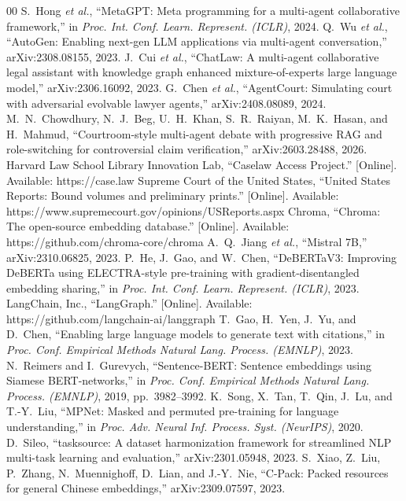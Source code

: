 \documentclass[conference]{IEEEtran}
\begin{document}
\begin{thebibliography}{00}
 S.~Hong \emph{et al.}, ``MetaGPT: Meta programming for a multi-agent collaborative framework,'' in \emph{Proc. Int. Conf. Learn. Represent. (ICLR)}, 2024.
 Q.~Wu \emph{et al.}, ``AutoGen: Enabling next-gen LLM applications via multi-agent conversation,'' arXiv:2308.08155, 2023.
 J.~Cui \emph{et al.}, ``ChatLaw: A multi-agent collaborative legal assistant with knowledge graph enhanced mixture-of-experts large language model,'' arXiv:2306.16092, 2023.
 G.~Chen \emph{et al.}, ``AgentCourt: Simulating court with adversarial evolvable lawyer agents,'' arXiv:2408.08089, 2024.
 M.~N.~Chowdhury, N.~J.~Beg, U.~H.~Khan, S.~R.~Raiyan, M.~K.~Hasan, and H.~Mahmud, ``Courtroom-style multi-agent debate with progressive RAG and role-switching for controversial claim verification,'' arXiv:2603.28488, 2026.
 Harvard Law School Library Innovation Lab, ``Caselaw Access Project.'' [Online]. Available: https://case.law
 Supreme Court of the United States, ``United States Reports: Bound volumes and preliminary prints.'' [Online]. Available: https://www.supremecourt.gov/opinions/USReports.aspx
 Chroma, ``Chroma: The open-source embedding database.'' [Online]. Available: https://github.com/chroma-core/chroma
 A.~Q.~Jiang \emph{et al.}, ``Mistral 7B,'' arXiv:2310.06825, 2023.
 P.~He, J.~Gao, and W.~Chen, ``DeBERTaV3: Improving DeBERTa using ELECTRA-style pre-training with gradient-disentangled embedding sharing,'' in \emph{Proc. Int. Conf. Learn. Represent. (ICLR)}, 2023.
 LangChain, Inc., ``LangGraph.'' [Online]. Available: https://github.com/langchain-ai/langgraph
 T.~Gao, H.~Yen, J.~Yu, and D.~Chen, ``Enabling large language models to generate text with citations,'' in \emph{Proc. Conf. Empirical Methods Natural Lang. Process. (EMNLP)}, 2023.
 N.~Reimers and I.~Gurevych, ``Sentence-BERT: Sentence embeddings using Siamese BERT-networks,'' in \emph{Proc. Conf. Empirical Methods Natural Lang. Process. (EMNLP)}, 2019, pp.~3982--3992.
 K.~Song, X.~Tan, T.~Qin, J.~Lu, and T.-Y.~Liu, ``MPNet: Masked and permuted pre-training for language understanding,'' in \emph{Proc. Adv. Neural Inf. Process. Syst. (NeurIPS)}, 2020.
 D.~Sileo, ``tasksource: A dataset harmonization framework for streamlined NLP multi-task learning and evaluation,'' arXiv:2301.05948, 2023.
 S.~Xiao, Z.~Liu, P.~Zhang, N.~Muennighoff, D.~Lian, and J.-Y.~Nie, ``C-Pack: Packed resources for general Chinese embeddings,'' arXiv:2309.07597, 2023.
\end{thebibliography}
\end{document}
